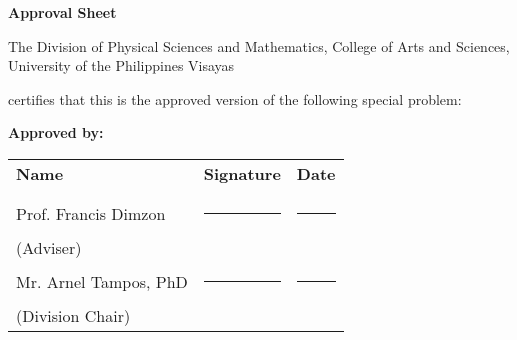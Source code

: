 \begin{center}
\textbf{Approval Sheet}
	
The Division of Physical Sciences and Mathematics, College of Arts and Sciences, University of the Philippines Visayas 

certifies that this is the approved version of the following special problem:

\end{center}

{\small\textbf{Approved by:}}

\newcommand{\signaturerule}{\rule{10em}{.4pt}}
	\begin{tabular}{lll}
		\bfseries Name  & \bfseries Signature & \bfseries Date\\ \\
		 Prof. Francis Dimzon &\signaturerule  & \signaturerule\\ 
		(Adviser)\\ 
		 Mr. Arnel Tampos, PhD &\signaturerule &\signaturerule\\
		(Division Chair)

	\end{tabular}
